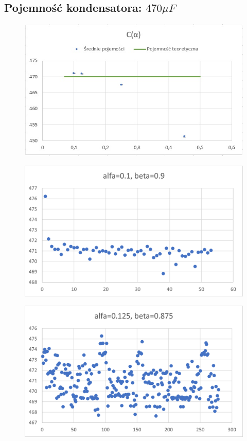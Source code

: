 \documentclass[12pt]{mwart}
\begin{document}
	\subsection{Pojemność kondensatora: $470 \mu F$}
	\begin{figure}[H]
		\centering
		\includegraphics{470_sr.jpg}
	\end{figure}
	\begin{figure}[H]
		\centering
		\includegraphics{470_a0.1.png}
	\end{figure}
	\begin{figure}[H]
		\centering
		\includegraphics{470_a0.125.png}
	\end{figure}
\end{document}
